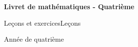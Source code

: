 \usepackage[utf8]{inputenc}
\usepackage[T1]{fontenc}
\usepackage[french]{babel}
\usepackage{lmodern}
\usepackage[a4paper,margin=2cm]{geometry}
\usepackage{pdfpages}
\usepackage[hidelinks]{hyperref}

\newcommand{\livretTitre}{Livret de mathématiques - Quatrième}
\newcommand{\modeLivret}{\ifavecexercices Leçons et exercices\else Leçons\fi}

\newcommand{\chapitre}[4]{%
  \setcounter{chapter}{#1-1}%
  \ifavecexercices
    \IfFileExists{#4}{%
    }{}%
  \fi
}



\begin{titlepage}
  \centering
  \vspace*{4cm}
  {\Huge\bfseries \livretTitre\par}
  \vspace{1.5cm}
  {\Large \modeLivret\par}
  \vfill
  {\large Année de quatrième\par}
\end{titlepage}

\tableofcontents
\clearpage

